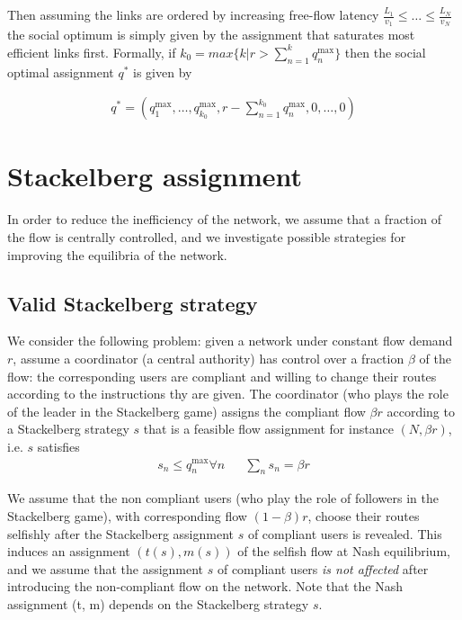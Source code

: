 Then assuming the links are ordered by increasing free-flow latency $\frac{L_1}{v_1} \leq \dots \leq \frac{L_N}{v_N}$ the social optimum is simply given by the assignment that saturates most efficient links first. Formally, if $k_0 = max \{ k | r > \sum_{n = 1}^k q_n^{\max}\}$
then the social optimal assignment $q^*$ is given by

\begin{align}
q^* = (q_1^{\max}, \dots, q_{k_0}^{\max}, r - \sum_{n = 1}^{k_0} q_n^{\max}, 0, \dots, 0)
\end{align}

\section{Stackelberg assignment}
In order to reduce the inefficiency of the network, we assume that a fraction of the flow is centrally controlled, and we investigate possible strategies for improving the equilibria of the network. 


\subsection{Valid Stackelberg strategy}
We consider the following problem: given a network under constant flow demand $r$, assume a coordinator (a central authority) has control over a fraction $\beta$ of the flow: the corresponding users are compliant and willing to change their routes according to the instructions thy are given. The coordinator (who plays the role of the leader in the Stackelberg game) assigns the compliant flow $\beta r$ according to a Stackelberg strategy $s$ that is a feasible flow assignment for instance $(N, \beta r)$, i.e. $s$ satisfies
\begin{align*}
s_n \leq q_n^{\max} \forall n && \sum_n s_n = \beta r
\end{align*}

We assume that the non compliant users (who play the role of followers in the Stackelberg game), with corresponding flow $(1-\beta)r$, choose their routes selfishly after the Stackelberg assignment $s$ of compliant users is revealed. This induces an assignment $(t(s), m(s))$ of the selfish flow at Nash equilibrium, and we assume that the assignment $s$ of compliant users \emph{is not affected} after introducing the non-compliant flow on the network. Note that the Nash assignment (t, m) depends on the Stackelberg strategy $s$.

